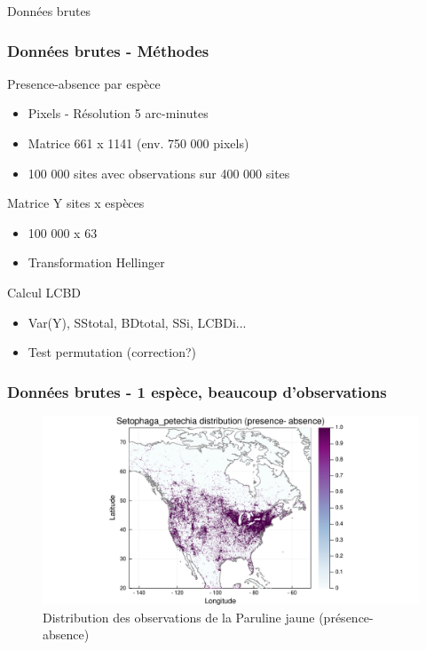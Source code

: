 \documentclass[10pt]{beamer}
\begin{document}
\begin{frame}
  \vfill
  \centering
  \huge Données brutes
  \vfill
\end{frame}

\begin{frame}
  \frametitle{Données brutes - Méthodes}
  Presence-absence par espèce
  \begin{itemize}
    \item Pixels - Résolution 5 arc-minutes
    \item Matrice 661 x 1141 (env. 750 000 pixels)
    \item 100 000 sites avec observations sur 400 000 sites
  \end{itemize}
  \medskip
  Matrice Y sites x espèces
  \begin{itemize}
    \item 100 000 x 63
    \item Transformation Hellinger
  \end{itemize}
  \medskip
  Calcul LCBD
  \begin{itemize}
    \item Var(Y), SStotal, BDtotal, SSi, LCBDi...
    \item Test permutation (correction?)
  \end{itemize}
\end{frame}

\begin{frame}
  \frametitle{Données brutes - 1 espèce, beaucoup d'observations}
  \begin{figure}
    \centering
    \hspace*{-2cm}\includegraphics[scale=0.5]{../fig/raw/raw-sp-Setophaga_petechia.pdf}
    \caption{Distribution des observations de la Paruline jaune (présence-absence)}
  \end{figure}
\end{frame}
\end{document}
